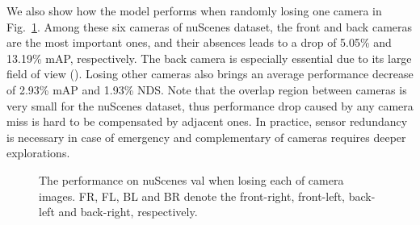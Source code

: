 \documentclass[10pt,twocolumn,letterpaper]{article}
\begin{document}
\begin{table}[h]
\caption{Quantitative results on the nuScenes val set with extrinsics noises. The metrics in each cell are mAP[\%].  denotes the maximum angle of three axes is M in degree. }
    \label{table:rob_rot}
\end{table}

We also show how the model performs when randomly losing one camera in Fig.~\ref{fig:ab_cam_miss}. Among these six cameras of nuScenes dataset, the front and back cameras are the most important ones, and their absences leads to a drop of 5.05\% and 13.19\% mAP, respectively. The back camera is especially essential due to its large field of view (). Losing other cameras also brings an average performance decrease of 2.93\% mAP and 1.93\% NDS. Note that the overlap region between cameras is very small for the nuScenes dataset, thus performance drop caused by any camera miss is hard to be compensated by adjacent ones. In practice, sensor redundancy is necessary in case of emergency and complementary of cameras requires deeper explorations.

\begin{figure}[h]
  \caption{The performance on nuScenes val when losing each of camera images. FR, FL, BL and BR denote the front-right, front-left, back-left and back-right, respectively.}
  \label{fig:ab_cam_miss}
\end{figure}
\end{document}

